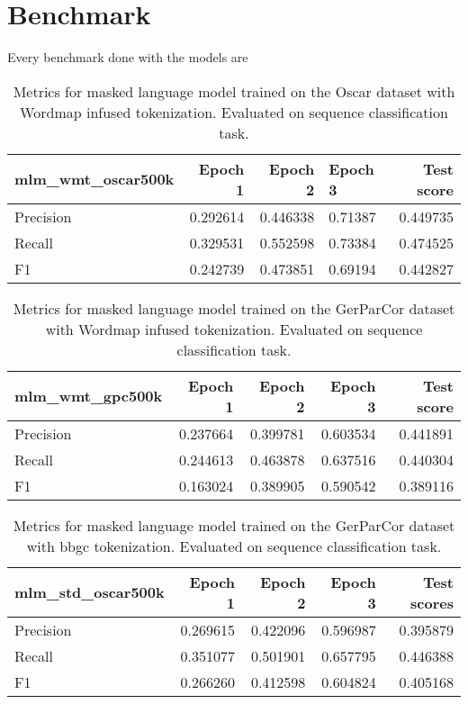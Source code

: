\section{Benchmark}
\label{sec:benchmark}
Every benchmark done with the models are
\begin{table}
    \centering
    \begin{tabular}{lrrlr}
        \toprule
        \textbf{mlm\_wmt\_oscar500k} & \textbf{Epoch 1} & \textbf{Epoch 2} & \textbf{Epoch 3} & \textbf{Test score} \\
        \midrule
        Precision & 0.292614 & 0.446338 & 0.71387 & 0.449735 \\
        Recall & 0.329531 & 0.552598 & 0.73384 & 0.474525 \\
        F1 & 0.242739 & 0.473851 & 0.69194 & 0.442827 \\
        \bottomrule
    \end{tabular}
    \caption{Metrics for masked language model trained on the Oscar dataset with Wordmap infused  tokenization. Evaluated on sequence classification task.}
    \label{tab:mlm-wmt-oscar500k}
\end{table}


\begin{table}
    \centering
    \begin{tabular}{lrrrr}
        \toprule
        \textbf{mlm\_wmt\_gpc500k} & \textbf{Epoch 1} & \textbf{Epoch 2} & \textbf{Epoch 3} & \textbf{Test score} \\
        \midrule
        Precision & 0.237664 & 0.399781 & 0.603534 & 0.441891 \\
        Recall & 0.244613 & 0.463878 & 0.637516 & 0.440304 \\
        F1 & 0.163024 & 0.389905 & 0.590542 & 0.389116 \\
        \bottomrule
    \end{tabular}
    \caption{Metrics for masked language model trained on the GerParCor dataset with Wordmap infused tokenization. Evaluated on sequence classification task.}
    \label{tab:mlm-wmt-gpc500k}
\end{table}

\begin{table}
    \centering
    \begin{tabular}{lrrrr}
        \toprule
        \textbf{mlm\_std\_oscar500k} & \textbf{Epoch 1} & \textbf{Epoch 2} & \textbf{Epoch 3} & \textbf{Test scores} \\
        \midrule
        Precision & 0.269615 & 0.422096 & 0.596987 & 0.395879 \\
        Recall & 0.351077 & 0.501901 & 0.657795 & 0.446388 \\
        F1 & 0.266260 & 0.412598 & 0.604824 & 0.405168 \\
        \bottomrule
    \end{tabular}
    \caption{Metrics for masked language model trained on the GerParCor dataset with \ac{bbgc} tokenization. Evaluated on sequence classification task.}
    \label{tab:mlm-std-oscar500k}
\end{table}

